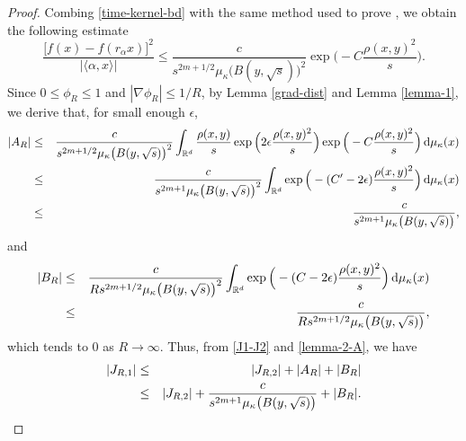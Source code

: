 \documentclass[11pt,a4paper]{article}
\def\R{\mathbb{R}}
\def\d{\textup{d}}
\theoremstyle{definition}\newtheorem{remark}[theorem]{Remark}
\begin{document}
\begin{proof}
Combing \eqref{time-kernel-bd} with the same method used to prove \cite[(4.12)]{ADH2019}, we obtain the following estimate
$$\frac{\big[f(x)-f(r_\alpha x)\big]^2}{|\langle \alpha,x\rangle|}\leq\frac{c}{s^{2m+1/2}\mu_\kappa\big(B(y,\sqrt{s})\big)^2}\exp\Big(-{C}\frac{\rho(x,y)^2}{s}\Big).$$
Since $0\leq\phi_R\leq1$ and $|\nabla \phi_R|\leq 1/R$, by Lemma \ref{grad-dist} and Lemma \ref{lemma-1}, we derive that, for small enough $\epsilon$,
\begin{eqnarray}\label{lemma-2-A}
|A_R|&\leq&\frac{c}{s^{2m+1/2}\mu_\kappa\big(B(y,\sqrt{s})\big)^2}\int_{\R^d}\frac{\rho(x,y)}{s}\exp\Big(2\epsilon\frac{\rho(x,y)^2}{s}\Big)
\exp\Big(-{C}\frac{\rho(x,y)^2}{s}\Big)\,\d\mu_\kappa(x)\cr
&\leq&\frac{c}{s^{2m+1}\mu_\kappa\big(B(y,\sqrt{s})\big)^2}\int_{\R^d}\exp\Big(-{(C'-2\epsilon)}\frac{\rho(x,y)^2}{s}\Big)\,\d\mu_\kappa(x)\cr
&\leq&\frac{c}{s^{2m+1}\mu_\kappa\big(B(y,\sqrt{s})\big)},
\end{eqnarray}
and
\begin{eqnarray}\label{lemma-2-B}
|B_R|&\leq&\frac{c}{R s^{2m+1/2}\mu_\kappa\big(B(y,\sqrt{s})\big)^2}\int_{\R^d}\exp\Big(-{(C-2\epsilon)}\frac{\rho(x,y)^2}{s}\Big)\,\d\mu_\kappa(x)\cr
&\leq&\frac{c}{R s^{2m+1/2}\mu_\kappa\big(B(y,\sqrt{s})\big)},
\end{eqnarray}
which tends to $0$ as $R\rightarrow\infty$.  Thus, from \eqref{J1-J2} and \eqref{lemma-2-A}, we have
\begin{eqnarray}\label{lemma-2-1}
|J_{R,1}|&\leq&|J_{R,2}|+|A_R|+|B_R|\cr
&\leq&|J_{R,2}|+\frac{c}{s^{2m+1}\mu_\kappa\big(B(y,\sqrt{s})\big)}+|B_R|.
\end{eqnarray}


\end{proof}
\end{document}
